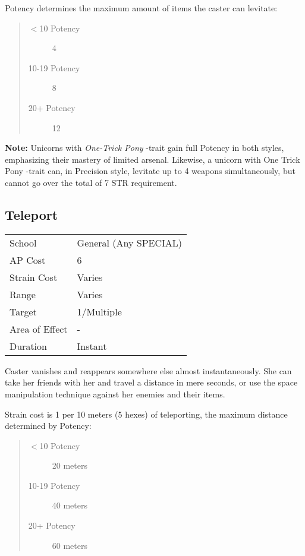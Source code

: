 \documentclass[11pt,a4paper,twocolumn]{book}
\begin{document}
Potency determines the maximum amount of items the caster can levitate:

\begin{quote}
	\begin{description}
		\item[$<$10 Potency] 	4
		\item[10-19 Potency] 	8
		\item[20+ Potency] 		12
	\end{description}	
\end{quote}

\textbf{Note:} Unicorns with \textit{One-Trick Pony} -trait gain full Potency in both styles, emphasizing their mastery of limited arsenal. Likewise, a unicorn with One Trick Pony -trait can, in Precision style, levitate up to 4 weapons simultaneously, but cannot go over the total of 7 STR requirement.

\newpage

\subsection*{Teleport}
{
	\begin{tabu} to 75mm{| X[l,4] | X[l,7] |}
		\hline
		School 			& General (Any SPECIAL) 		\\
		AP Cost	      	& 6 						    \\
		Strain Cost     & Varies 						\\
		Range     		& Varies					    \\
		Target      	& 1/Multiple					\\
		Area of Effect  & - 	 						\\
		Duration     	& Instant						\\ \hline
	\end{tabu}
	
}

\medskip

Caster vanishes and reappears somewhere else almost instantaneously. She can take her friends with her and travel a distance in mere seconds, or use the space manipulation technique against her enemies and their items.

Strain cost is 1 per 10 meters (5 hexes) of teleporting, the maximum distance determined by Potency:
\begin{quote}
	\begin{description}
		\item[$<$10 Potency] 	20 meters
		\item[10-19 Potency] 	40 meters
		\item[20+ Potency] 		60 meters
	\end{description}
\end{quote}
\end{document}
